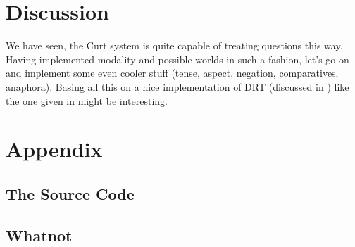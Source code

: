 \documentclass[a4paper,fontsize=12pt]{article}
\theoremstyle{remark} \newtheorem*{termin}{Definition} %
\begin{document}
\section{Discussion}

We have seen, the Curt system is quite capable of treating questions this way.
Having implemented modality and possible worlds in such a fashion, let's go on
and implement some even cooler stuff (tense, aspect, negation, comparatives,
anaphora). Basing all this on a nice implementation of DRT (discussed in
\cite{kampreyle:drt}) like the one given in \cite{blackburnbos:cl2} might be
interesting.

\section{Appendix}

\subsection{The Source Code}

\subsection{Whatnot}


\end{document}
